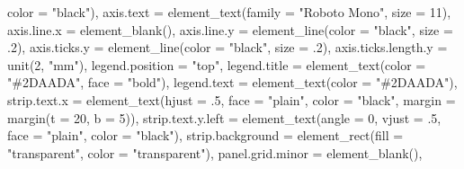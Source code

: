 \documentclass[
]{book}
\newenvironment{Shaded}{\begin{snugshade}}{\end{snugshade}}
\newcommand{\AttributeTok}[1]{\textcolor[rgb]{0.77,0.63,0.00}{#1}}
\newcommand{\DecValTok}[1]{\textcolor[rgb]{0.00,0.00,0.81}{#1}}
\newcommand{\FunctionTok}[1]{\textcolor[rgb]{0.00,0.00,0.00}{#1}}
\newcommand{\NormalTok}[1]{#1}
\newcommand{\StringTok}[1]{\textcolor[rgb]{0.31,0.60,0.02}{#1}}
\begin{document}
\begin{Shaded}
\begin{Highlighting}[]
                              \AttributeTok{color =} \StringTok{"black"}\NormalTok{),}
    \AttributeTok{axis.text =} \FunctionTok{element\_text}\NormalTok{(}\AttributeTok{family =} \StringTok{"Roboto Mono"}\NormalTok{, }
                             \AttributeTok{size =} \DecValTok{11}\NormalTok{),}
    \AttributeTok{axis.line.x =} \FunctionTok{element\_blank}\NormalTok{(),}
    \AttributeTok{axis.line.y =} \FunctionTok{element\_line}\NormalTok{(}\AttributeTok{color =} \StringTok{"black"}\NormalTok{, }
                               \AttributeTok{size =}\NormalTok{ .}\DecValTok{2}\NormalTok{),}
    \AttributeTok{axis.ticks.y =} \FunctionTok{element\_line}\NormalTok{(}\AttributeTok{color =} \StringTok{"black"}\NormalTok{, }
                                \AttributeTok{size =}\NormalTok{ .}\DecValTok{2}\NormalTok{),}
    \AttributeTok{axis.ticks.length.y =} \FunctionTok{unit}\NormalTok{(}\DecValTok{2}\NormalTok{, }\StringTok{"mm"}\NormalTok{),}
    \AttributeTok{legend.position =} \StringTok{"top"}\NormalTok{,}
    \AttributeTok{legend.title =} \FunctionTok{element\_text}\NormalTok{(}\AttributeTok{color =} \StringTok{"\#2DAADA"}\NormalTok{, }
                                \AttributeTok{face =} \StringTok{"bold"}\NormalTok{),}
    \AttributeTok{legend.text =} \FunctionTok{element\_text}\NormalTok{(}\AttributeTok{color =} \StringTok{"\#2DAADA"}\NormalTok{),}
    \AttributeTok{strip.text.x =} \FunctionTok{element\_text}\NormalTok{(}\AttributeTok{hjust =}\NormalTok{ .}\DecValTok{5}\NormalTok{, }
                                \AttributeTok{face =} \StringTok{"plain"}\NormalTok{, }
                                \AttributeTok{color =} \StringTok{"black"}\NormalTok{, }
                                \AttributeTok{margin =} \FunctionTok{margin}\NormalTok{(}\AttributeTok{t =} \DecValTok{20}\NormalTok{, }\AttributeTok{b =} \DecValTok{5}\NormalTok{)),}
    \AttributeTok{strip.text.y.left =} \FunctionTok{element\_text}\NormalTok{(}\AttributeTok{angle =} \DecValTok{0}\NormalTok{, }
                                     \AttributeTok{vjust =}\NormalTok{ .}\DecValTok{5}\NormalTok{, }
                                     \AttributeTok{face =} \StringTok{"plain"}\NormalTok{, }
                                     \AttributeTok{color =} \StringTok{"black"}\NormalTok{),}
    \AttributeTok{strip.background =} \FunctionTok{element\_rect}\NormalTok{(}\AttributeTok{fill =} \StringTok{"transparent"}\NormalTok{, }
                                    \AttributeTok{color =} \StringTok{"transparent"}\NormalTok{),}
    \AttributeTok{panel.grid.minor =} \FunctionTok{element\_blank}\NormalTok{(),}

\end{Highlighting}
\end{Shaded}
\end{document}
